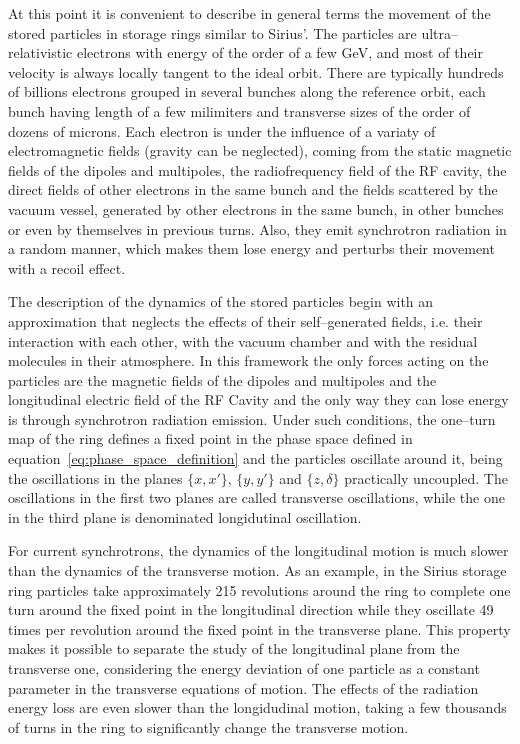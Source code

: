     At this point it is convenient to describe in general terms the movement of the stored particles in storage rings similar to Sirius'. The particles are ultra--relativistic electrons with energy of the order of a few \si{GeV}, and most of their velocity is always locally tangent to the ideal orbit. There are typically hundreds of billions electrons grouped in several bunches along the reference orbit, each bunch having length of a few milimiters and transverse sizes of the order of dozens of microns. Each electron is under the influence of a variaty of electromagnetic fields (gravity can be neglected), coming from the static magnetic fields of the dipoles and multipoles, the radiofrequency field of the RF cavity, the direct fields of other electrons in the same bunch and the fields scattered by the vacuum vessel, generated by other electrons in the same bunch, in other bunches or even by themselves in previous turns. Also, they emit synchrotron radiation in a random manner, which makes them lose energy and perturbs their movement with a recoil effect.

    The description of the dynamics of the stored particles begin with an approximation that neglects the effects of their self--generated fields, i.e. their interaction with each other, with the vacuum chamber and with the residual molecules in their atmosphere. In this framework the only forces acting on the particles are the magnetic fields of the dipoles and multipoles and the longitudinal electric field of the RF Cavity and the only way they can lose energy is through synchrotron radiation emission. Under such conditions, the one--turn map of the ring defines a fixed point in the phase space defined in equation~\eqref{eq:phase_space_definition} and the particles oscillate around it, being the oscillations in the planes $\{x,x'\}$, $\{y,y'\}$ and $\{z,\delta\}$ practically uncoupled. The oscillations in the first two planes are called transverse oscillations, while the one in the third plane is denominated longidutinal oscillation.

    For current synchrotrons, the dynamics of the longitudinal motion is much slower than the dynamics of the transverse motion. As an example, in the Sirius storage ring particles take approximately 215 revolutions around the ring to complete one turn around the fixed point in the longitudinal direction while they oscillate 49 times per revolution around the fixed point in the transverse plane. This property makes it possible to separate the study of the longitudinal plane from the transverse one, considering the energy deviation of one particle as a constant parameter in the transverse equations of motion. The effects of the radiation energy loss are even slower than the longidudinal motion, taking a few thousands of turns in the ring to significantly change the transverse motion.

